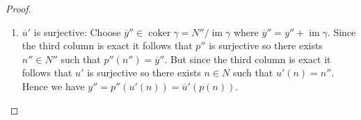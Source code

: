 \documentclass[8pt]{amsart}
\theoremstyle{plain}%
\theoremstyle{definition}
\theoremstyle{remark}
\numberwithin{equation}{section}
\newcommand{\im}{\operatorname{im}}
\newcommand{\coker}{\operatorname{coker}}
\begin{document}
\begin{proof}
\begin{enumerate}
		\item $\overline u'$ is surjective: Choose $\overline y'' \in \coker \gamma = N''/\im \gamma$ where $\overline y'' = y'' + \im \gamma$. Since the third column is exact it follows that $p''$ is surjective so there exists $n'' \in N''$ such that $p''(n'') = \overline y''$. But since the third column is exact it follows that $u'$ is surjective so there exists $n \in N$ such that $u'(n) = n''$. Hence we have $y'' = p''(u'(n)) = \overline u'(p(n))$.
	\end{enumerate}


	\end{proof}
\end{document}

